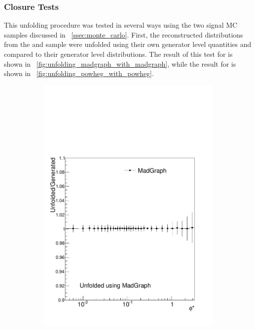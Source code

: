 \subsubsection{Closure Tests}

This unfolding procedure was tested in several ways using the two signal MC
samples discussed in \SEC~\ref{ssec:monte_carlo}. First, the reconstructed
\phistar distributions from the \MADGRAPH and \POWHEG sample were unfolded
using their own generator level quantities and compared to their generator
level \phistar distributions.
The result of this test for \MADGRAPH is shown
in \FIG~\ref{fig:unfolding_madgraph_with_madgraph}, while the result for
\POWHEG is shown in \FIG~\ref{fig:unfolding_powheg_with_powheg}.

\begin{figure}[!htbp]
    \centering
    \begin{subfigure}[b]{\SideBySidePlotWidth}
        \includegraphics[width=\textwidth]{figures/BinM_MM.pdf}

\end{subfigure}
\end{figure}

